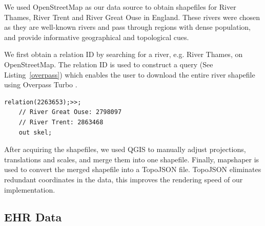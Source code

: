  We used OpenStreetMap \cite{openstreetmapRelation} as our data source to obtain shapefiles for River Thames, River Trent and River Great Ouse in England. These rivers were chosen as they are well-known rivers and pass through regions with dense population, and provide informative geographical and topological cues. 

We first obtain a relation ID by searching for a river, e.g. River Thames, on OpenStreetMap. The relation ID is used to construct a query (See Listing~\ref{overpass}) which enables the user to download the entire river shapefile using Overpass Turbo \cite{overpassturboOverpass}.

\begin{lstlisting}[caption={The query that downloads the shapefile of River Thames from OpenStreetMap via the Overpass Turbo API.}, label={overpass},captionpos=b]
    relation(2263653);>>;
    // River Great Ouse: 2798097
    // River Trent: 2863468
    out skel;
\end{lstlisting}

After acquiring the shapefiles, we used QGIS \cite{qgisWelcome} to manually adjust projections, translations and scales, and merge them into one shapefile. Finally, mapshaper \cite{blochMapshaper} is used to convert the merged shapefile into a TopoJSON \cite{TopoJSON} file. TopoJSON eliminates redundant coordinates in the data, this improves the rendering speed of our implementation.

\subsection{EHR Data}

